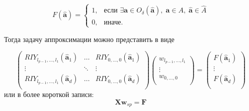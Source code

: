 \documentclass[12pt,twoside]{article}
\begin{document}
\begin{equation}
    F(\mathbf{\hat{\mathbf{a}}}) =
    \begin{cases}
	1, & \mbox{если } \exists \mathbf{a} \in O_{\delta}(\hat{\mathbf{a}}),
	\;\mathbf{a} \in A,\;\mathbf{\hat{a}} \in \hat{A}\\
    0, & \mbox{иначе}.
    \end{cases}
\label{eq:f_real}
\end{equation}





Тогда задачу аппроксимации можно представить в виде 

\begin{equation}
\begin{pmatrix} 
	RIY_{l_{p-1},...,l_1}(\hat{\mathbf{a}}_1) & \ldots &RIY_{0,...,0}(\hat{\mathbf{a}}_1)\\
	\vdots& \ddots & \vdots\\
	RIY_{l_{p-1},...,l_1}(\hat{\mathbf{a}}_d) & \ldots &RIY_{0,...,0}(\hat{\mathbf{a}}_d)\\
\end{pmatrix}
\begin{pmatrix} 
	w_{l_{p-1},...,l_1}\\
	\vdots\\
	w_{0,...,0}\\
\end{pmatrix}
=
\begin{pmatrix} 
	F(\hat{\mathbf{a}}_1)\\
	\vdots\\
	F(\hat{\mathbf{a}}_d)\\
\end{pmatrix}
\label{eq:sp_app_matrix}
\end{equation}
или в более короткой записи:
\begin{equation}
\mathbf{X}\mathbf{w}_{sp} =\mathbf{F}
\label{eq:sp_app_matrix_short}
\end{equation}
\end{document}
